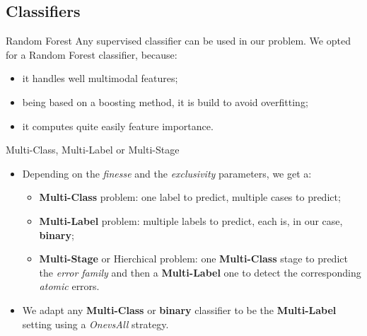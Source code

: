 \documentclass{beamer}
\begin{document}
        \subsection{Classifiers}
            \begin{frame}{Random Forest}
                Any supervised classifier can be used in our problem. We opted for a Random Forest classifier, because:
                \begin{itemize}[label=$\blacktriangleright$, font=\color{IGNGreen}]
                    \item<1-> it handles well multimodal features;
                    \item<2-> being based on a boosting method, it is build to avoid overfitting;
                    \item<3-> it computes quite easily feature importance.
                \end{itemize}
            \end{frame}
            \begin{frame}{Multi-Class, Multi-Label or Multi-Stage}
                \begin{itemize}[label=$\blacktriangleright$, font=\color{IGNGreen}]
                    \item<1-> Depending on the \emph{finesse} and the \emph{exclusivity} parameters, we get a:
                    \begin{itemize}[label=--]
                        \item<2-> \textbf{Multi-Class} problem: one label to predict, multiple cases to predict;
                        \item<3-> \textbf{Multi-Label} problem: multiple labels to predict, each is, in our case, \textbf{binary};
                        \item<4-> \textbf{Multi-Stage} or Hierchical problem: one \textbf{Multi-Class} stage to predict the \emph{error family} and then a \textbf{Multi-Label} one to detect the corresponding \emph{atomic} errors.
                    \end{itemize}
                    \item<5-> We adapt any \textbf{Multi-Class} or \textbf{binary} classifier to be the \textbf{Multi-Label} setting using a \emph{OnevsAll} strategy.
                \end{itemize}
            \end{frame}
\end{document}
